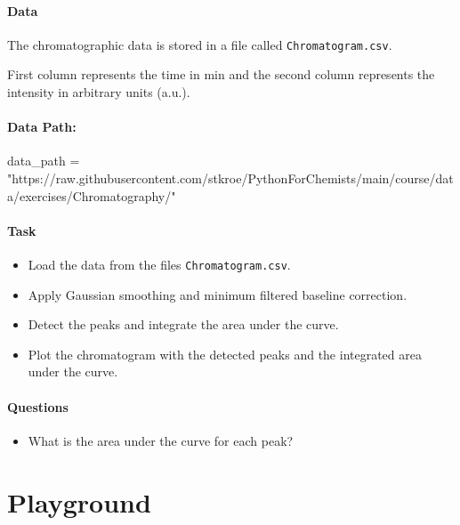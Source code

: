\documentclass[
  letterpaper,
  DIV=11,
  numbers=noendperiod]{scrreprt}
\newenvironment{Shaded}{\begin{snugshade}}{\end{snugshade}}
\newcommand{\NormalTok}[1]{\textcolor[rgb]{0.00,0.23,0.31}{#1}}
\newcommand{\OperatorTok}[1]{\textcolor[rgb]{0.37,0.37,0.37}{#1}}
\newcommand{\StringTok}[1]{\textcolor[rgb]{0.13,0.47,0.30}{#1}}
\providecommand{\tightlist}{%
  \setlength{\itemsep}{0pt}\setlength{\parskip}{0pt}}\usepackage{longtable,booktabs,array}
\begin{document}
\subsection{Data}\label{data-6}

The chromatographic data is stored in a file called
\texttt{Chromatogram.csv}.

First column represents the time in min and the second column represents
the intensity in arbitrary units (a.u.).

\subsection{Data Path:}\label{data-path-6}

\begin{Shaded}
\begin{Highlighting}[]
\NormalTok{data\_path }\OperatorTok{=} \StringTok{"https://raw.githubusercontent.com/stkroe/PythonForChemists/main/course/data/exercises/Chromatography/"}
\end{Highlighting}
\end{Shaded}

\subsection{Task}\label{task-7}

\begin{itemize}
\tightlist
\item
  Load the data from the files \texttt{Chromatogram.csv}.
\item
  Apply Gaussian smoothing and minimum filtered baseline correction.
\item
  Detect the peaks and integrate the area under the curve.
\item
  Plot the chromatogram with the detected peaks and the integrated area
  under the curve.
\end{itemize}

\subsection{Questions}\label{questions-7}

\begin{itemize}
\tightlist
\item
  What is the area under the curve for each peak?
\end{itemize}

\part{Playground}
\end{document}
